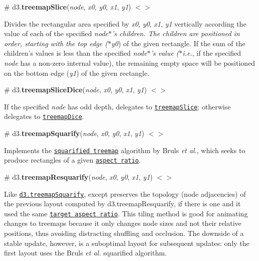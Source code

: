 \label{_treemapSlice}%
\# d3.{\bfseries treemap\+Slice}({\itshape node}, {\itshape x0}, {\itshape y0}, {\itshape x1}, {\itshape y1}) \href{https://github.com/d3/d3-hierarchy/blob/master/src/treemap/slice.js}{\tt $<$$>$}

Divides the rectangular area specified by {\itshape x0}, {\itshape y0}, {\itshape x1}, {\itshape y1} vertically according the value of each of the specified {\itshape node$\ast$’s children. The children are positioned in order, starting with the top edge ($\ast$y0}) of the given rectangle. If the sum of the children’s values is less than the specified {\itshape node$\ast$’s value ($\ast$i.e.}, if the specified {\itshape node} has a non-\/zero internal value), the remaining empty space will be positioned on the bottom edge ({\itshape y1}) of the given rectangle.

\label{_treemapSliceDice}%
\# d3.{\bfseries treemap\+Slice\+Dice}({\itshape node}, {\itshape x0}, {\itshape y0}, {\itshape x1}, {\itshape y1}) \href{https://github.com/d3/d3-hierarchy/blob/master/src/treemap/sliceDice.js}{\tt $<$$>$}

If the specified {\itshape node} has odd depth, delegates to \href{#treemapSlice}{\tt treemap\+Slice}; otherwise delegates to \href{#treemapDice}{\tt treemap\+Dice}.

\label{_treemapSquarify}%
\# d3.{\bfseries treemap\+Squarify}({\itshape node}, {\itshape x0}, {\itshape y0}, {\itshape x1}, {\itshape y1}) \href{https://github.com/d3/d3-hierarchy/blob/master/src/treemap/squarify.js}{\tt $<$$>$}

Implements the \href{https://www.win.tue.nl/~vanwijk/stm.pdf}{\tt squarified treemap} algorithm by Bruls {\itshape et al.}, which seeks to produce rectangles of a given \href{#squarify_ratio}{\tt aspect ratio}.

\label{_treemapResquarify}%
\# d3.{\bfseries treemap\+Resquarify}({\itshape node}, {\itshape x0}, {\itshape y0}, {\itshape x1}, {\itshape y1}) \href{https://github.com/d3/d3-hierarchy/blob/master/src/treemap/resquarify.js}{\tt $<$$>$}

Like \href{#treemapSquarify}{\tt d3.\+treemap\+Squarify}, except preserves the topology (node adjacencies) of the previous layout computed by d3.\+treemap\+Resquarify, if there is one and it used the same \href{#resquarify_ratio}{\tt target aspect ratio}. This tiling method is good for animating changes to treemaps because it only changes node sizes and not their relative positions, thus avoiding distracting shuffling and occlusion. The downside of a stable update, however, is a suboptimal layout for subsequent updates\+: only the first layout uses the Bruls {\itshape et al.} squarified algorithm.

